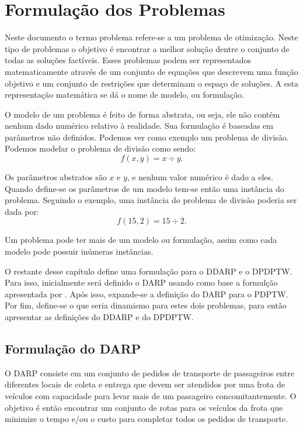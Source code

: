 \chapter{Formulação dos Problemas}\label{ch:formulacao_problemas}
Neste documento o termo problema refere-se a um problema de otimização.
Neste tipo de problemas o objetivo é encontrar a melhor solução dentre o
conjunto de todas as soluções factíveis.
Esses problemas podem ser representados matematicamente através de um conjunto
de equações que descrevem uma função objetivo e um conjunto de restrições que
determinam o espaço de soluções.
A esta representação matemática se dá o nome de modelo, ou formulação.

O modelo de um problema é feito de forma abstrata, ou seja, ele não
contém nenhum dado numérico relativo à realidade. 
Sua formulação é baseadas em parâmetros não definidos.
Podemos ver como exemplo um problema de divisão.
Podemos modelar o problema de divisão como sendo:
%
\begin{equation}
  f(x, y) = x \div y.
\end{equation}

\noindent Os parâmetros abstratos são $x$ e $y$, e nenhum valor 
numérico é dado a eles.
Quando define-se os parâmetros de um modelo tem-se então uma instância do
problema.
Seguindo o exemplo, uma instância do problema de divisão poderia ser dada por:
%
\begin{equation}
  f(15, 2) = 15 \div 2.
\end{equation}

\noindent Um problema pode ter mais de um modelo ou formulação, assim como cada
modelo pode possuir inúmeras instâncias.

O restante desse capítulo define uma formulação para o DDARP e o DPDPTW. 
Para isso, inicialmente será definido o DARP usando como base a formulção 
apresentada por \textcite{cordeau_tabu_2003}. 
Após isso, expande-se a definição do DARP para o PDPTW. 
Por fim, define-se o que seria dinamismo para estes dois problemas, para então 
apresentar as definições do DDARP e do DPDPTW.

\section{Formulação do DARP}\label{sec:formulacao_DARP}
O DARP consiste em um conjunto de pedidos de transporte de passageiros entre 
diferentes locais de coleta e entrega que devem ser atendidos por uma frota
de veículos com capacidade para levar mais de um passageiro concomitantemente. 
O objetivo é então encontrar um conjunto de rotas para os veículos da frota
que minimize o tempo e/ou o custo para completar todos os pedidos de
transporte.

